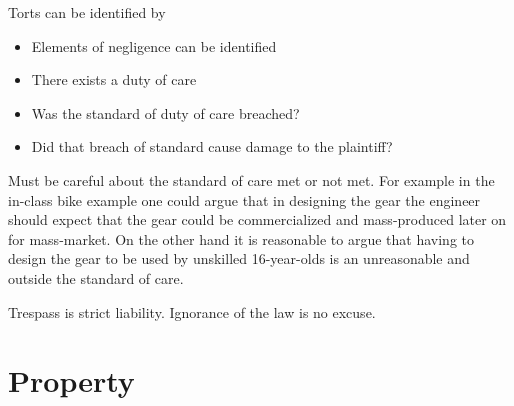 \documentclass[10pt]{article}
\begin{document}
Torts can be identified by

\begin{itemize}
	\item Elements of negligence can be identified
	\item There exists a duty of care
	\item Was the standard of duty of care breached?
	\item Did that breach of standard cause damage to the plaintiff?
\end{itemize}

\begin{blockquote}
	Must be careful about the standard of care met or not met. For example in the in-class bike example one could argue that in designing the gear the engineer should expect that the gear could be commercialized and mass-produced later on for mass-market. 
	On the other hand it is reasonable to argue that having to design the gear to be used by unskilled 16-year-olds is an unreasonable and outside the standard of care.
\end{blockquote}



Trespass is strict liability. 
Ignorance of the law is no excuse.


\section{Property}
\end{document}
